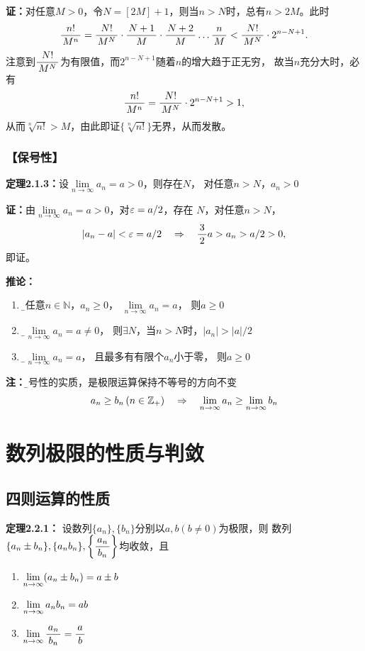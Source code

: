 {\bf 证：}对任意$M>0$，令$N=[2M]+1$，则当$n>N$时，总有$n>2M$。此时
$$\displaystyle\frac{\,{n!}\,}{\,{M^n}\,}=\displaystyle\frac{\,{N!}\,}{\,{M^N}\,}\cdot\displaystyle\frac{\,{N+1}\,}{\,{M}\,}
\cdot\displaystyle\frac{\,{N+2}\,}{\,{M}\,}\ldots\displaystyle\frac{\,{n}\,}{\,{M}\,}<\displaystyle\frac{\,{N!}\,}{\,{M^N}\,}\cdot2^{n-N+1}.$$
注意到$\displaystyle\frac{\,{N!}\,}{\,{M^N}\,}$为有限值，而$2^{n-N+1}$随着$n$的增大趋于正无穷，
故当$n$充分大时，必有
$$\displaystyle\frac{\,{n!}\,}{\,{M^n}\,}=\displaystyle\frac{\,{N!}\,}{\,{M^N}\,}\cdot2^{n-N+1}>1,$$
从而$\sqrt[n]{n!}>M$，由此即证$\{\sqrt[n]{n!}\}$无界，从而发散。

\subsubsection{【保号性】}

{\bf 定理2.1.3：}设$\lim\limits_{n\to\infty}a_n=a>0$，则存在$N$，
对任意$n>N$，$a_n>0$

{\bf 证：}由$\lim\limits_{n\to\infty}a_n=a>0$，对$\varepsilon=a/2$，存在
$N$，对任意$n>N$，
$$|a_n-a|<\varepsilon=a/2\quad\Rightarrow\quad \displaystyle\frac{\,{3}\,}{\,{2}\,}a>a_n>a/2>0,$$
即证。
		
{{\bf 推论：}} 
\begin{enumerate}
  \setlength{\itemindent}{1cm}
  \item {\b 对任意$n\in\mathbb{N}$，$a_n\geq
  0$， $\lim\limits_{n\to\infty}a_n=a$， 则$a\geq 0$}
  \item {\b 设$\lim\limits_{n\to\infty}a_n=a\ne
  0$， 则$\exists N$，当$n>N$时，$|a_n|>|a|/2$} 
  \item {\b 
  设$\lim\limits_{n\to\infty}a_n=a$， 且最多有有限个$a_n$小于零， 则$a\geq 0$}
\end{enumerate}	

{\bf 注：}{\b 保号性的实质，是极限运算保持不等号的方向不变
$$a_n\geq b_n\,(n\in\mathbb{Z}_+)\quad\Rightarrow
\quad\lim\limits_{n\to\infty} a_n\geq\lim\limits_{n\to\infty} b_n$$
}

\section{数列极限的性质与判敛}

\subsection{四则运算的性质}

{\bf 定理2.2.1：}
设数列$\{a_n\},\{b_n\}$分别以$a,b(b\neq 0)$为极限，则
数列$\{a_n\pm b_n\},\{a_nb_n\},\left\{\displaystyle\frac{\,{a_n}\,}{\,{b_n}\,}\right\}$均收敛，且
\begin{enumerate}
  \setlength{\itemindent}{1cm}
  \item $\lim\limits_{n\to\infty}(a_n\pm b_n)=a\pm b$
  \item $\lim\limits_{n\to\infty} a_nb_n=ab$
  \item $\lim\limits_{n\to\infty}\displaystyle\frac{\,{a_n}\,}{\,{b_n}\,}=\displaystyle\frac{\,{a}\,}{\,{b}\,}$
\end{enumerate}


